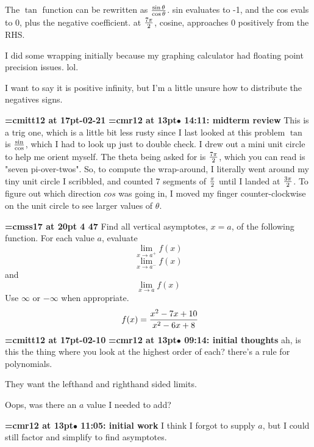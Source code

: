 The $\tan$ function can be rewritten as ${\sin \theta \over \cos \theta}$. sin evaluates to -1, and the cos evals to 0, plus the negative coefficient. at $7\pi \over 2$, cosine, approaches 0 positively from the RHS.
\par

I did some wrapping initially because my graphing calculator had floating point precision issues. lol.
\par

I want to say it is positive infinity, but I'm a little unsure how to distribute the negatives signs.
\par

{\medskip\noindent\bf\font\titlefont=cmitt12 at 17pt-02-21}\medskip
{\smallskip\noindent\bf\font\titlefont=cmr12 at 13pt\titlefont $\bullet$ 14:11: midterm review}\smallskip
This is a trig one, which is a little bit less rusty since I last looked at this problem $\tan$ is $\sin \over \cos$, which I had to look up just to double check. I drew out a mini unit circle to help me orient myself. The theta being asked for is ${7 \pi \over 2}$, which you can read is "seven pi-over-twos". So, to compute the wrap-around, I literally went around my tiny unit circle I scribbled, and counted 7 segments of $\pi \over 2$ until I landed at ${3 \pi \over 2}$. To figure out which direction $cos$ was going in, I moved my finger counter-clockwise on the unit circle to see larger values of $\theta$.
\par

{\medskip\noindent\bf\font\titlefont=cmss17 at 20pt 4 47}\medskip
Find all vertical asymptotes, $x = a$, of the following
function. For each value $a$, evaluate
$$\lim_{x \to a^{+}}{f(x)}$$
$$\lim_{x \to a^{-}}{f(x)}$$ and
$$\lim_{x \to a}{f(x)}$$
Use $\infty$ or $-\infty$ when
appropriate.
$$\
f(x) = {
x^2 - 7x + 10
\over
x^2 - 6x + 8
}
$$
{\medskip\noindent\bf\font\titlefont=cmitt12 at 17pt-02-10}\medskip
{\smallskip\noindent\bf\font\titlefont=cmr12 at 13pt\titlefont $\bullet$ 09:14: initial thoughts}\smallskip
ah, is this the thing where you look at the highest order of each? there's a rule for polynomials.
\par

They want the lefthand and righthand sided limits.
\par

Oops, was there an $a$ value I needed to add?
\par

{\smallskip\noindent\bf\font\titlefont=cmr12 at 13pt\titlefont $\bullet$ 11:05: initial work}\smallskip
I think I forgot to supply $a$, but I could still factor and simplify to find asymptotes.
\par

